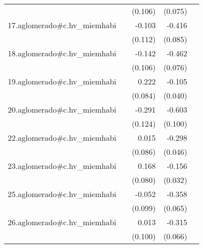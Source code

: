 {\begin{longtable}{l*{4}{D{.}{.}{-1}}}
            &                     &     (0.106)         &     (0.075)         &                     \\
\addlinespace
17.aglomerado#c.hv\_miemhabi&                     &      -0.103         &      -0.416\sym{***}&                     \\
            &                     &     (0.112)         &     (0.085)         &                     \\
\addlinespace
18.aglomerado#c.hv\_miemhabi&                     &      -0.142         &      -0.462\sym{***}&                     \\
            &                     &     (0.106)         &     (0.076)         &                     \\
\addlinespace
19.aglomerado#c.hv\_miemhabi&                     &       0.222\sym{**} &      -0.105\sym{**} &                     \\
            &                     &     (0.084)         &     (0.040)         &                     \\
\addlinespace
20.aglomerado#c.hv\_miemhabi&                     &      -0.291\sym{*}  &      -0.603\sym{***}&                     \\
            &                     &     (0.124)         &     (0.100)         &                     \\
\addlinespace
22.aglomerado#c.hv\_miemhabi&                     &       0.015         &      -0.298\sym{***}&                     \\
            &                     &     (0.086)         &     (0.046)         &                     \\
\addlinespace
23.aglomerado#c.hv\_miemhabi&                     &       0.168\sym{*}  &      -0.156\sym{***}&                     \\
            &                     &     (0.080)         &     (0.032)         &                     \\
\addlinespace
25.aglomerado#c.hv\_miemhabi&                     &      -0.052         &      -0.358\sym{***}&                     \\
            &                     &     (0.099)         &     (0.065)         &                     \\
\addlinespace
26.aglomerado#c.hv\_miemhabi&                     &       0.013         &      -0.315\sym{***}&                     \\
            &                     &     (0.100)         &     (0.066)         &                     \\

\end{longtable}}
